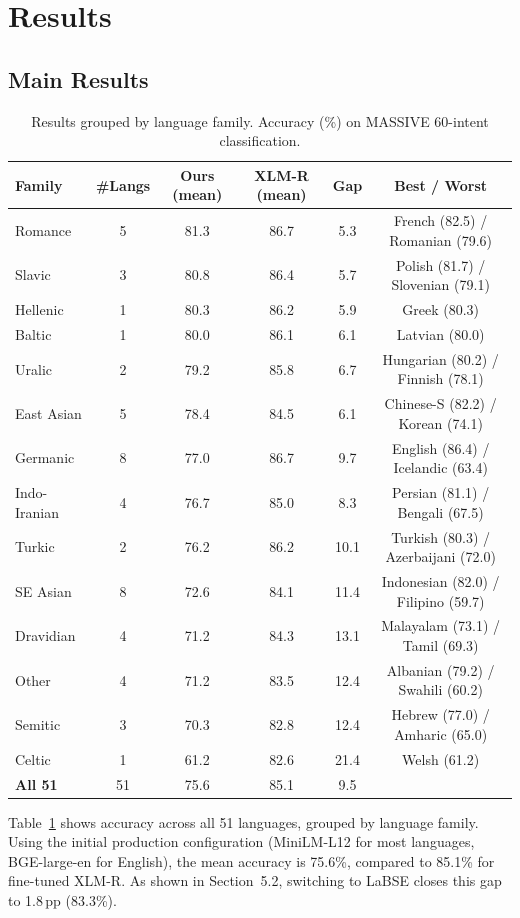 \documentclass[11pt]{article}
\begin{document}
\section{Results}

\subsection{Main Results}

\begin{table}[t]
\centering
\caption{Results grouped by language family. Accuracy (\%) on MASSIVE 60-intent classification.}
\label{tab:main}
\small
\begin{tabular}{lccccc}
\toprule
Family & \#Langs & Ours (mean) & XLM-R (mean) & Gap & Best / Worst \\
\midrule
Romance & 5 & 81.3 & 86.7 & 5.3 & French (82.5) / Romanian (79.6) \\
Slavic & 3 & 80.8 & 86.4 & 5.7 & Polish (81.7) / Slovenian (79.1) \\
Hellenic & 1 & 80.3 & 86.2 & 5.9 & Greek (80.3) \\
Baltic & 1 & 80.0 & 86.1 & 6.1 & Latvian (80.0) \\
Uralic & 2 & 79.2 & 85.8 & 6.7 & Hungarian (80.2) / Finnish (78.1) \\
East Asian & 5 & 78.4 & 84.5 & 6.1 & Chinese-S (82.2) / Korean (74.1) \\
Germanic & 8 & 77.0 & 86.7 & 9.7 & English (86.4) / Icelandic (63.4) \\
Indo-Iranian & 4 & 76.7 & 85.0 & 8.3 & Persian (81.1) / Bengali (67.5) \\
Turkic & 2 & 76.2 & 86.2 & 10.1 & Turkish (80.3) / Azerbaijani (72.0) \\
SE Asian & 8 & 72.6 & 84.1 & 11.4 & Indonesian (82.0) / Filipino (59.7) \\
Dravidian & 4 & 71.2 & 84.3 & 13.1 & Malayalam (73.1) / Tamil (69.3) \\
Other & 4 & 71.2 & 83.5 & 12.4 & Albanian (79.2) / Swahili (60.2) \\
Semitic & 3 & 70.3 & 82.8 & 12.4 & Hebrew (77.0) / Amharic (65.0) \\
Celtic & 1 & 61.2 & 82.6 & 21.4 & Welsh (61.2) \\
\midrule
\textbf{All 51} & 51 & 75.6 & 85.1 & 9.5 & \\
\bottomrule
\end{tabular}
\end{table}

Table~\ref{tab:main} shows accuracy across all 51 languages, grouped by language family. Using the initial production configuration (MiniLM-L12 for most languages, BGE-large-en for English), the mean accuracy is 75.6\%, compared to 85.1\% for fine-tuned XLM-R. As shown in Section~5.2, switching to LaBSE closes this gap to 1.8\,pp (83.3\%).
\end{document}
